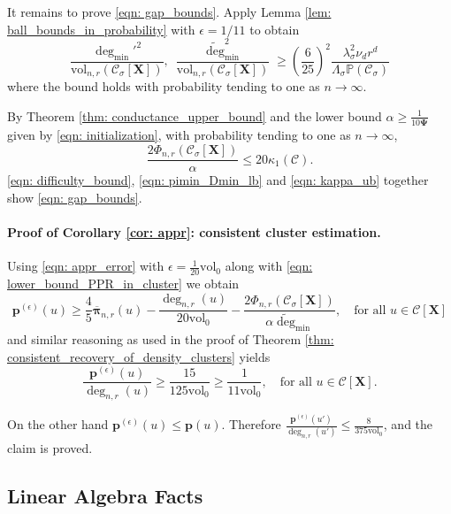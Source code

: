 \documentclass{article}
\newcommand{\vol}{\mathrm{vol}}
\newcommand{\1}{\mathbf{1}}
\newcommand{\degminpr}{\deg_{\min}'}
\newcommand{\degminwt}{\widetilde{\deg}_{\min}}
\newcommand{\pbf}{\mathbf{p}}
\newcommand{\pibf}{\bm{\pi}}
\newcommand{\Xbf}{\mathbf{X}}
\newcommand{\Pbb}{\mathbb{P}}
\newcommand{\Cset}{\mathcal{C}}
\newcommand{\Csig}{\Cset_{\sigma}}
\theoremstyle{aldenthm}
\begin{document}
It remains to prove \eqref{eqn: gap_bounds}. Apply Lemma \ref{lem: ball_bounds_in_probability} with $\epsilon = 1/11$ to obtain
\begin{equation}
\label{eqn: pimin_Dmin_lb}
\frac{\degminpr^2}{\vol_{n,r}(\Csig[\Xbf])},~ \frac{\degminwt^2}{\vol_{n,r}(\Csig[\Xbf])} \geq \left(\frac{6}{25}\right)^2 \frac{\lambda_{\sigma}^2 \nu_d r^d}{\Lambda_{\sigma}\Pbb(\Csig)}  
\end{equation}
where the bound holds with probability tending to one as $n \to \infty$.

By Theorem \ref{thm: conductance_upper_bound} and the lower bound $\alpha \geq \frac{1}{10 \mathbf{\Psi}}$ given by \eqref{eqn: initialization}, with probability tending to one as $n \to \infty$,
\begin{equation}
\label{eqn: difficulty_bound}
\frac{2\Phi_{n,r}(\Csig[\Xbf])}{\alpha} \leq 20\kappa_1(\Cset).
\end{equation}
\eqref{eqn: difficulty_bound}, \eqref{eqn: pimin_Dmin_lb} and \eqref{eqn: kappa_ub} together show \eqref{eqn: gap_bounds}.

\paragraph{Proof of Corollary \ref{cor: appr}: consistent cluster estimation.}

Using \eqref{eqn: appr_error} with $\epsilon = \frac{1}{20}\vol_0$ along with \eqref{eqn: lower_bound_PPR_in_cluster} we obtain
\begin{equation*}
\pbf^{(\epsilon)}(u) \geq \frac{4}{5} \overline{\pibf}_{n,r}(u) - \frac{\deg_{n,r}(u)}{20\vol_0} - \frac{2\Phi_{n,r}(\Csig[\Xbf])}{\alpha \degminwt}, \quad \textrm{for all $u \in \Cset[\Xbf]$}
\end{equation*}
and similar reasoning as used in the proof of Theorem \ref{thm: consistent_recovery_of_density_clusters} yields
\begin{equation*}
\frac{\pbf^{(\epsilon)}(u)}{\deg_{n,r}(u)} \geq \frac{15}{125\vol_0} \geq \frac{1}{11 \vol_0}, \quad \textrm{for all $u \in \Cset[\Xbf]$}.
\end{equation*}

On the other hand $\pbf^{(\epsilon)}(u) \leq \pbf(u)$. Therefore $\frac{\pbf^{(\epsilon)}(u')}{\deg_{n,r}(u')} \leq \frac{8}{375\vol_0}$, and the claim is proved.


\subsection{Linear Algebra Facts}
\label{sec: linalg}
\end{document}
